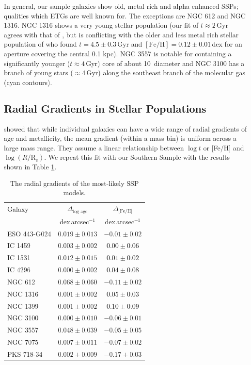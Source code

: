 \documentclass[a4paper,fleqn,usenatbib]{mnras}
\begin{document}
	In general, our sample galaxies show old, metal rich and alpha enhanced SSPs; qualities which ETGs are well known for. The exceptions are NGC 612 and NGC 1316. NGC 1316 shows a very young stellar population (our fit of $t \approx 2$\,Gyr agrees with that of \citealt{Kuntschner2000}, but is conflicting with the older and less metal rich stellar population of \citealt{Koleva2011} who found $t=4.5 \pm 0.3 \,\mathrm{Gyr}$ and $\mathrm{[Fe/H]}=0.12 \pm 0.01 \,\mathrm{dex}$ for an aperture covering the central 0.1 kpc). NGC 3557 is notable for containing a significantly younger ($t\approx 4$\,Gyr) core of about 10\arcsec\ diameter and NGC 3100 has a branch of young stars ($\approx 4$\,Gyr) along the southeast branch of the molecular gas (cyan contours).

	\subsection{Radial Gradients in Stellar Populations}
		\label{subsec:popGrad}

		\citet{Koleva2011} showed that while individual galaxies can have a wide range of radial gradients of age and metallicity, the mean gradient (within a mass bin) is uniform across a large mass range. They assume a linear relationship between $\log t$ or [Fe/H] and $\log (R/\mathrm{R_e})$. We repeat this fit with our Southern Sample with the results shown in Table \ref{tab:popGrad}. 

		\begin{table}
			\centering
			\caption{The radial gradients of the most-likely SSP models.}
			\label{tab:popGrad}
			\begin{tabular}{l c c}
				\hline
				\hline 
				Galaxy 	& $\Delta_\text{log age}$ & $\Delta_\text{[Fe/H]}$ \\ 
					& dex\,arcsec$^{-1}$ & dex\,arcsec$^{-1}$ \\
				\hline
				ESO 443-G024 & $0.019 \pm 0.013$ & $-0.01 \pm 0.02$ \\
				IC 1459 	& $0.003 \pm 0.002$ & $0.00 \pm 0.06$ \\
				IC 1531 	& $0.012 \pm 0.015$ & $0.01 \pm 0.02$ \\
				IC 4296		& $0.000 \pm 0.002$ & $0.04 \pm 0.08$ \\
				NGC 612 	& $0.068 \pm 0.060$ & $-0.11 \pm 0.02$ \\
				NGC 1316 	& $0.001 \pm 0.002$ & $0.05 \pm 0.03$ \\
				NGC 1399 	& $0.001 \pm 0.002$ & $0.10 \pm 0.09$ \\
				NGC 3100 	& $0.000 \pm 0.010$ & $-0.06 \pm 0.01$ \\
				NGC 3557 	& $0.048 \pm 0.039$ & $-0.05 \pm 0.05$ \\
				NGC 7075 	& $0.007 \pm 0.011$ & $-0.07 \pm 0.02$ \\
				PKS 718-34  & $0.002 \pm 0.009$ & $-0.17 \pm 0.03$ \\
				\hline
				\hline
			\end{tabular}
		\end{table}
\end{document}
